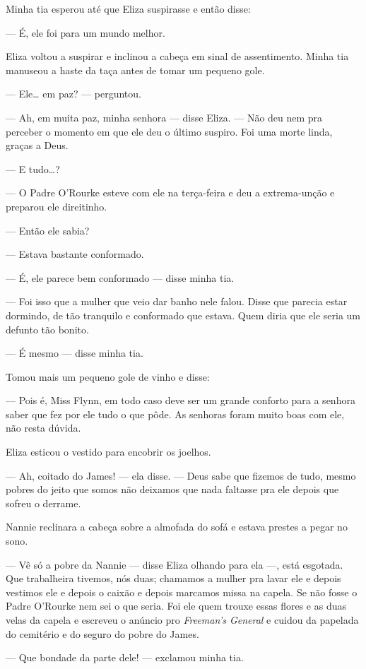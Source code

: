 Minha tia esperou até que Eliza suspirasse e então disse:

--- É, ele foi para um mundo melhor.

Eliza voltou a suspirar e inclinou a cabeça em sinal de
assentimento. Minha tia manuseou a haste da taça antes de tomar um
pequeno gole.

--- Ele\ldots{} em paz? --- perguntou.

--- Ah, em muita paz, minha senhora --- disse Eliza. --- Não deu
nem pra perceber o momento em que ele deu o último suspiro. Foi uma
morte linda, graças a Deus.

--- E tudo\ldots{}?

--- O Padre O'Rourke esteve com ele na terça-feira e deu a
extrema-unção e preparou ele direitinho.

--- Então ele sabia?

--- Estava bastante conformado.

--- É, ele parece bem conformado --- disse minha tia.

--- Foi isso que a mulher que veio dar banho nele falou. Disse que
parecia estar dormindo, de tão tranquilo e conformado que estava. Quem
diria que ele seria um defunto tão bonito.

--- É mesmo --- disse minha tia.

Tomou mais um pequeno gole de vinho e disse:

--- Pois é, Miss Flynn, em todo caso deve ser um grande conforto
para a senhora saber que fez por ele tudo o que pôde. As senhoras
foram muito boas com ele, não resta dúvida.

Eliza esticou o vestido para encobrir os joelhos.

--- Ah, coitado do James! --- ela disse. --- Deus sabe que
fizemos de tudo, mesmo pobres do jeito que somos não deixamos que nada
faltasse pra ele depois que sofreu o derrame.

Nannie reclinara a cabeça sobre a almofada do sofá e estava prestes a
pegar no sono.

--- Vê só a pobre da Nannie --- disse Eliza olhando para ela ---, está
esgotada. Que trabalheira tivemos, nós duas; chamamos a mulher pra
lavar ele e depois vestimos ele e depois o caixão e depois marcamos
missa na capela. Se não fosse o Padre O'Rourke nem sei o que seria.
Foi ele quem trouxe essas flores e as duas velas
da capela e escreveu o anúncio pro \textit{Freeman's General} e cuidou da
papelada do cemitério e do seguro do pobre do James.

--- Que bondade da parte dele! --- exclamou minha tia.

